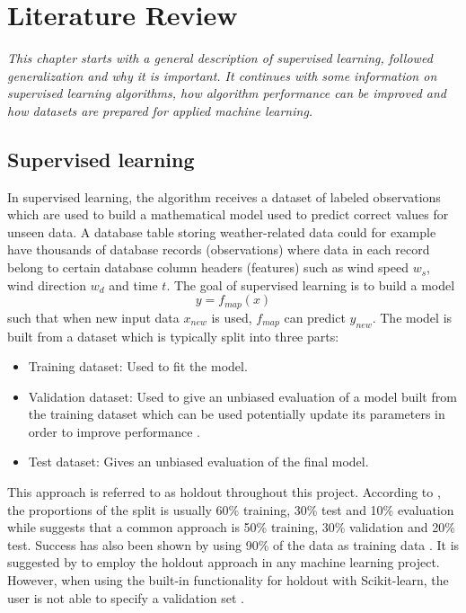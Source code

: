 \chapter{Literature Review} \label {ch:theory}
\emph{This chapter starts with a general description of supervised learning, followed generalization and why it is important. It continues with some information on supervised learning algorithms, how algorithm performance can be improved and how datasets are prepared for applied machine learning.}


\section{Supervised learning} \label{sec:supervisedlearning}
	In supervised learning, the algorithm receives a dataset of labeled observations which are used to build a mathematical model used to predict correct values for unseen data. A database table storing weather-related data could for example have thousands of database records (observations) where data in each record belong to certain database column headers (features) such as wind speed $w_s$, wind direction $w_d$ and time $t$. The goal of supervised learning is to build a model
\begin{equation} \label{eq:mappingfunction}
	y = f_{map}(x)
\end{equation}
such that when new input data $x_{new}$ is used, $f_{map}$ can predict $y_{new}$. The model is built from a dataset which is typically split into three parts:

\begin{itemize}
	\item {Training dataset:} Used to fit the model.
	\item {Validation dataset:} Used to give an unbiased evaluation of a model built from the training dataset which can be used potentially update its parameters in order to improve performance \cite{BOOK:6}.  %
	\item {Test dataset:} Gives an unbiased evaluation of the final model.
\end{itemize}
	This approach is referred to as holdout throughout this project.  According to \cite{BOOK:6}, the proportions of the split is usually 60\% training, 30\% test and 10\% evaluation while \cite{ARTICLE:4} suggests that a common approach is 50\% training, 30\% validation and 20\% test. Success has also been shown by using 90\% of the data as training data \cite{ARTICLE:19}. It is suggested by \cite{ARTICLE:4} to employ the holdout approach in any machine learning project. However, when using the built-in functionality for holdout with Scikit-learn, the user is not able to specify a validation set \cite{WEBSITE:34}. 

